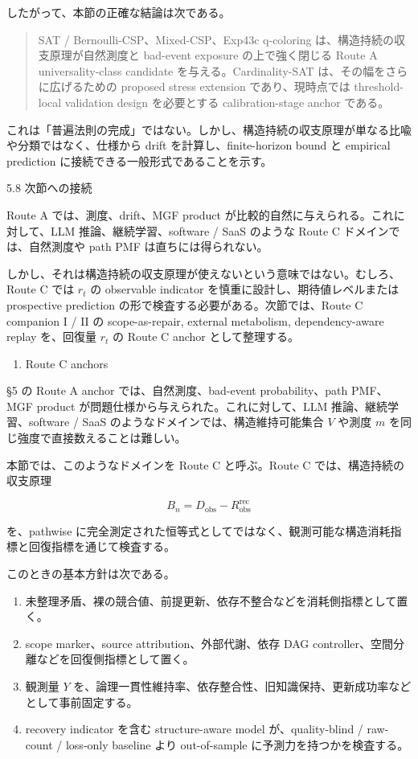 \documentclass[12pt,a4paper]{article}
\begin{document}
したがって、本節の正確な結論は次である。

\begin{quote}
SAT / Bernoulli-CSP、Mixed-CSP、Exp43c q-coloring は、構造持続の収支原理が自然測度と bad-event exposure の上で強く閉じる Route A universality-class candidate を与える。Cardinality-SAT は、その幅をさらに広げるための proposed stress extension であり、現時点では threshold-local validation design を必要とする calibration-stage anchor である。
\end{quote}

これは「普遍法則の完成」ではない。しかし、構造持続の収支原理が単なる比喩や分類ではなく、仕様から drift を計算し、finite-horizon bound と empirical prediction に接続できる一般形式であることを示す。

5.8 次節への接続

Route A では、測度、drift、MGF product が比較的自然に与えられる。これに対して、LLM 推論、継続学習、software / SaaS のような Route C ドメインでは、自然測度や path PMF は直ちには得られない。

しかし、それは構造持続の収支原理が使えないという意味ではない。むしろ、Route C では \(r_{t}\) の observable indicator を慎重に設計し、期待値レベルまたは prospective prediction の形で検査する必要がある。次節では、Route C companion I / II の scope-as-repair, external metabolism, dependency-aware replay を、回復量 \(r_{t}\) の Route C anchor として整理する。

\begin{enumerate}
\def\labelenumi{\arabic{enumi}.}
\setcounter{enumi}{5}
\tightlist
\item
  Route C anchors
\end{enumerate}

§5 の Route A anchor では、自然測度、bad-event probability、path PMF、MGF product が問題仕様から与えられた。これに対して、LLM 推論、継続学習、software / SaaS のようなドメインでは、構造維持可能集合 \(V\) や測度 \(m\) を同じ強度で直接数えることは難しい。

本節では、このようなドメインを Route C と呼ぶ。Route C では、構造持続の収支原理

\[
B_{n}=D_{\mathrm{obs}}-R_{\mathrm{obs}}^{\mathrm{rec}}
\]

を、pathwise に完全測定された恒等式としてではなく、観測可能な構造消耗指標と回復指標を通じて検査する。

このときの基本方針は次である。

\begin{enumerate}
\def\labelenumi{\arabic{enumi}.}
\tightlist
\item
  未整理矛盾、裸の競合値、前提更新、依存不整合などを消耗側指標として置く。
\item
  scope marker、source attribution、外部代謝、依存 DAG controller、空間分離などを回復側指標として置く。
\item
  観測量 \(Y\) を、論理一貫性維持率、依存整合性、旧知識保持、更新成功率などとして事前固定する。
\item
  recovery indicator を含む structure-aware model が、quality-blind / raw-count / loss-only baseline より out-of-sample に予測力を持つかを検査する。
\end{enumerate}
\end{document}
